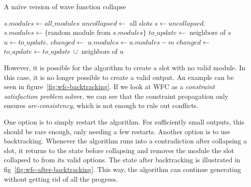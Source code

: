 \begin{algorithm}[H]
    \caption{A na\"{i}ve version of wave function collapse}
    \label{alg:wfc}
    \begin{algorithmic}[1]
         
        \State $s.modules \gets all\_modules$
        \EndFor
        \Statex
        \State $uncollapsed \gets$ all slots
        \State $s \gets uncollapsed$. 
        \State $s.modules \gets \{$random module from $s.modules\}$
        \Statex
        \State $to\_update \gets$ neighbors of $s$ 
        \State $u \gets to\_update$.
        \Statex
        \State $changed \gets$ 
         
        \State $u.modules \gets u.modules - m$
        \State $changed \gets$ 
        \EndIf
        \EndFor
        \Statex
         
        \State $to\_update \gets to\_update\,\cup$ neighbors of $u$
        \EndIf
        \Statex
        \EndWhile
        \EndWhile
        \Statex
    \end{algorithmic}
\end{algorithm}

However, it is possible for the algorithm to create a slot with no valid module.
In this case, it is no longer possible to create a valid output.
An example can be seen in figure~\ref{fig:wfc-backtracking}.
If we look at WFC as a \emph{constraint satisfaction problem} solver, we can see that the constraint propagation only ensures \emph{arc-consistency}, which is not enough to rule out conflicts.

One option is to simply restart the algorithm.
For sufficiently small outputs, this should be rare enough, only needing a few restarts.
Another option is to use backtracking.
Whenever the algorithm runs into a contradiction after collapsing a slot, it returns to the state before collapsing and removes the module the slot collapsed to from its valid options.
The state after backtracking is illustrated in fig~\ref{fig:wfc-after-backtracking}.
This way, the algorithm can continue generating without getting rid of all the progress.

